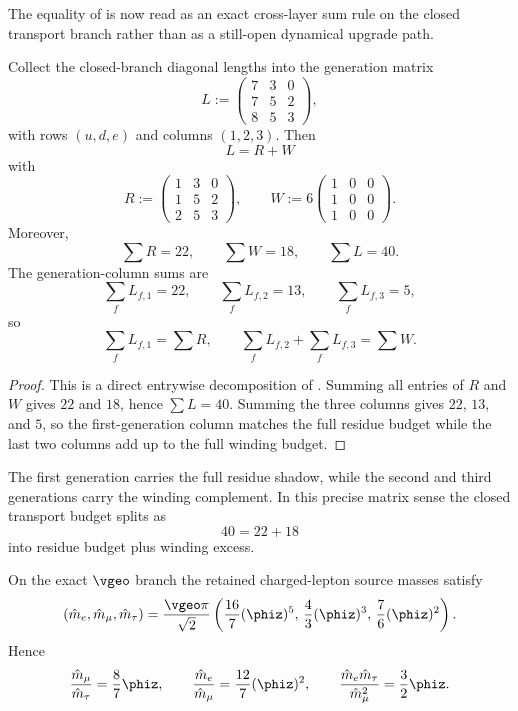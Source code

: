 \begin{remark}
The equality of  is now read as an exact cross-layer sum
rule on the closed transport branch rather than as a still-open dynamical upgrade path.
\end{remark}

\begin{proposition}
\label{prop:transport-matrix-normal-form}
Collect the closed-branch diagonal lengths into the generation matrix
\[
L:=
\begin{pmatrix}
7&3&0\\
7&5&2\\
8&5&3
\end{pmatrix},
\]
with rows $(u,d,e)$ and columns $(1,2,3)$. Then
\[
L=R+W
\]
with
\[
R:=
\begin{pmatrix}
1&3&0\\
1&5&2\\
2&5&3
\end{pmatrix},
\qquad
W:=
6\begin{pmatrix}
1&0&0\\
1&0&0\\
1&0&0
\end{pmatrix}.
\]
Moreover,
\[
\sum R=22,
\qquad
\sum W=18,
\qquad
\sum L=40.
\]
The generation-column sums are
\[
\sum_f L_{f,1}=22,
\qquad
\sum_f L_{f,2}=13,
\qquad
\sum_f L_{f,3}=5,
\]
so
\[
\sum_f L_{f,1}=\sum R,
\qquad
\sum_f L_{f,2}+\sum_f L_{f,3}=\sum W.
\]
\end{proposition}

\begin{proof}
This is a direct entrywise decomposition of . Summing all entries of
$R$ and $W$ gives $22$ and $18$, hence $\sum L=40$. Summing the three columns gives
$22$, $13$, and $5$, so the first-generation column matches the full residue budget while the last
two columns add up to the full winding budget.
\end{proof}

\begin{remark}
The first generation carries the full residue shadow, while the second and third generations carry
the winding complement. In this precise matrix sense the closed transport budget splits as
\[
40=22+18
\]
into residue budget plus winding excess.
\end{remark}

\begin{theorem}
\label{thm:charged-lepton-compression}
On the exact $\vgeo$ branch the retained charged-lepton source masses satisfy
\[
(\hat m_e,\hat m_\mu,\hat m_\tau)
=
\frac{\vgeo\pi}{\sqrt2}
\left(
\frac{16}{7}(\phiz)^5,\,
\frac{4}{3}(\phiz)^3,\,
\frac{7}{6}(\phiz)^2
\right).
\]
Hence
\[
\frac{\hat m_\mu}{\hat m_\tau}=\frac{8}{7}\phiz,
\qquad
\frac{\hat m_e}{\hat m_\mu}=\frac{12}{7}(\phiz)^2,
\qquad
\frac{\hat m_e \hat m_\tau}{\hat m_\mu^2}=\frac{3}{2}\phiz.
\]
\end{theorem}

